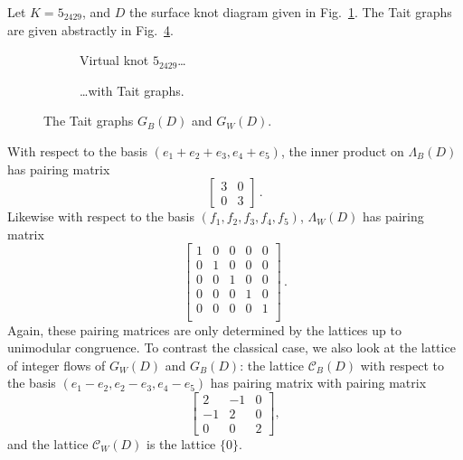 \documentclass[12pt]{report}
\theoremstyle{upright}
\begin{document}
Let $K = 5_{2429}$, and $D$ the surface knot diagram given in Fig.~\ref{fig:5-2429-vknot}. The Tait graphs are given abstractly in Fig.~\ref{fig:5-2429-taits-abstract}.

\begin{figure}[hbt]
	\hspace*{\fill}
	\begin{subfigure}[b]{0.45 \textwidth}
		\centering
		\def\svgscale{0.35}
		
		\caption{Virtual knot $5_{2429}$\ldots}
		\label{fig:5-2429-vknot}
	\end{subfigure}
	\hspace*{\fill}
	\begin{subfigure}[b]{0.45 \textwidth}
		\centering
		\def\svgscale{0.35}
		
		\caption{\ldots with Tait graphs.}
		\label{fig:5-2429-taits}
	\end{subfigure}
	\hspace*{\fill}
	\caption{}
	\label{fig:5-2429-example}
\end{figure}

\begin{figure}[hbt]
	\centering
	\def\svgscale{0.4}
	
	\caption{The Tait graphs $G_{B}(D)$ and $G_{W}(D)$.}
	\label{fig:5-2429-taits-abstract}
\end{figure}

With respect to the basis $(e_{1} + e_{2} + e_{3}, e_{4} + e_{5})$, the inner product on $\Lambda_{B}(D)$ has pairing matrix
\[\begin{bmatrix}
3 & 0 \\
0 & 3
\end{bmatrix}\,.\]
Likewise with respect to the basis $(f_{1}, f_{2}, f_{3}, f_{4}, f_{5})$, $\Lambda_{W}(D)$ has pairing matrix
\[\begin{bmatrix}
1 & 0 & 0 & 0 & 0\\
0 & 1 & 0 & 0 & 0\\
0 & 0 & 1 & 0 & 0\\
0 & 0 & 0 & 1 & 0\\
0 & 0 & 0 & 0 & 1\\
\end{bmatrix}\,.\]
Again, these pairing matrices are only determined by the lattices up to unimodular congruence.
To contrast the classical case, we also look at the lattice of integer flows of $G_{W}(D)$ and $G_{B}(D)$: the lattice $\mathcal{C}_{B}(D)$ with respect to the basis $(e_{1} - e_{2}, e_{2} - e_{3}, e_{4} - e_{5})$ has pairing matrix
with pairing matrix
\[\begin{bmatrix}
	2  & -1 & 0 \\
	-1 & 2  & 0 \\
	0  & 0  & 2
\end{bmatrix},\]
and the lattice $\mathcal{C}_{W}(D)$ is the lattice $\{ 0 \}$.
\end{document}
